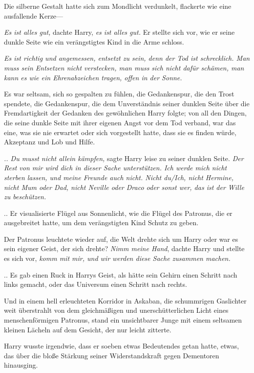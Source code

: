 {Die silberne Gestalt hatte sich zum Mondlicht verdunkelt, flackerte wie eine ausfallende Kerze—

\emph{Es ist alles gut,} dachte Harry, \emph{es ist alles gut.} Er stellte sich vor, wie er seine dunkle Seite wie ein verängstigtes Kind in die Arme schloss.

\emph{Es ist richtig und angemessen, entsetzt zu sein, denn der Tod ist schrecklich. Man muss sein Entsetzen nicht verstecken, man muss sich nicht dafür schämen, man kann es wie ein Ehrenabzeichen tragen, offen in der Sonne.}

Es war seltsam, sich so gespalten zu fühlen, die Gedankenspur, die den Trost spendete, die Gedankenspur, die dem Unverständnis seiner dunklen Seite über die Fremdartigkeit der Gedanken des gewöhnlichen Harry folgte; von all den Dingen, die seine dunkle Seite mit ihrer eigenen Angst vor dem Tod verband, war das eine, was sie nie erwartet oder sich vorgestellt hatte, dass sie es finden würde, Akzeptanz und Lob und Hilfe.

\emph{.. Du musst nicht allein kämpfen,} sagte Harry leise zu seiner dunklen Seite. \emph{Der Rest von mir wird dich in dieser Sache unterstützen. Ich werde mich nicht sterben lassen, und meine Freunde auch nicht. Nicht du/Ich, nicht Hermine, nicht Mum oder Dad, nicht Neville oder Draco oder sonst wer, das ist der Wille zu beschützen.}

.. Er visualisierte Flügel aus Sonnenlicht, wie die Flügel des Patronus, die er ausgebreitet hatte, um dem verängstigten Kind Schutz zu geben.

Der Patronus leuchtete wieder auf, die Welt drehte sich um Harry oder war es sein eigener Geist, der sich drehte? \emph{Nimm meine Hand}, dachte Harry und stellte es sich vor, \emph{komm mit mir, und wir werden diese Sache zusammen machen.}

.. Es gab einen Ruck in Harrys Geist, als hätte sein Gehirn einen Schritt nach links gemacht, oder das Universum einen Schritt nach rechts.

Und in einem hell erleuchteten Korridor in Askaban, die schummrigen Gaslichter weit überstrahlt von dem gleichmäßigen und unerschütterlichen Licht eines menschenförmigen Patronus, stand ein unsichtbarer Junge mit einem seltsamen kleinen Lächeln auf dem Gesicht, der nur leicht zitterte.

Harry wusste irgendwie, dass er soeben etwas Bedeutendes getan hatte, etwas, das über die bloße Stärkung seiner Widerstandskraft gegen Dementoren hinausging.

}
